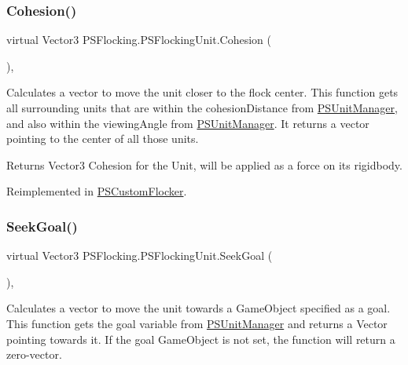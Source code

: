 \subsubsection{\texorpdfstring{Cohesion()}{Cohesion()}}
{\footnotesize\ttfamily virtual Vector3 P\+S\+Flocking.\+P\+S\+Flocking\+Unit.\+Cohesion (\begin{DoxyParamCaption}{ }\end{DoxyParamCaption})\hspace{0.3cm}{\ttfamily [protected]}, {\ttfamily [virtual]}}



Calculates a vector to move the unit closer to the flock center. This function gets all surrounding units that are within the cohesion\+Distance from \hyperlink{class_p_s_flocking_1_1_p_s_unit_manager}{P\+S\+Unit\+Manager}, and also within the viewing\+Angle from \hyperlink{class_p_s_flocking_1_1_p_s_unit_manager}{P\+S\+Unit\+Manager}. It returns a vector pointing to the center of all those units. 

\begin{DoxyReturn}{Returns}
Vector3 Cohesion for the Unit, will be applied as a force on its rigidbody. 
\end{DoxyReturn}


Reimplemented in \hyperlink{class_p_s_custom_flocker_a46d7ff69872c12983a666293794b976f}{P\+S\+Custom\+Flocker}.

\mbox{\label{class_p_s_flocking_1_1_p_s_flocking_unit_ab2ce12145c79e5e179f841412ed2febb}} 
\subsubsection{\texorpdfstring{Seek\+Goal()}{SeekGoal()}}
{\footnotesize\ttfamily virtual Vector3 P\+S\+Flocking.\+P\+S\+Flocking\+Unit.\+Seek\+Goal (\begin{DoxyParamCaption}{ }\end{DoxyParamCaption})\hspace{0.3cm}{\ttfamily [protected]}, {\ttfamily [virtual]}}



Calculates a vector to move the unit towards a Game\+Object specified as a goal. This function gets the goal variable from \hyperlink{class_p_s_flocking_1_1_p_s_unit_manager}{P\+S\+Unit\+Manager} and returns a Vector pointing towards it. If the goal Game\+Object is not set, the function will return a zero-\/vector. 

